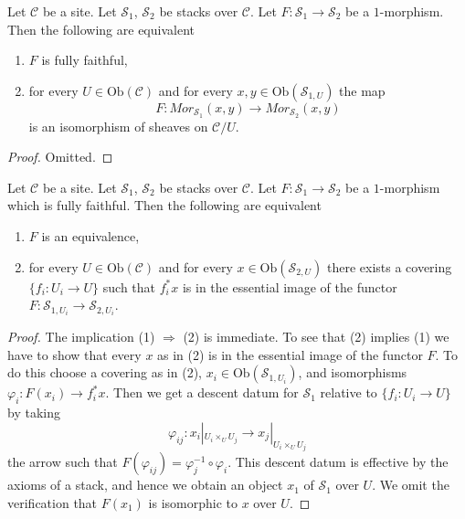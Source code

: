 \begin{lemma}
\label{lemma-characterize-ff}
Let $\mathcal{C}$ be a site.
Let $\mathcal{S}_1$, $\mathcal{S}_2$ be stacks over $\mathcal{C}$.
Let $F : \mathcal{S}_1 \to \mathcal{S}_2$ be a $1$-morphism.
Then the following are equivalent
\begin{enumerate}
\item $F$ is fully faithful,
\item for every $U \in \text{Ob}(\mathcal{C})$ and for every
$x, y \in \text{Ob}(\mathcal{S}_{1, U})$ the map
$$
F :
\mathit{Mor}_{\mathcal{S}_1}(x, y)
\longrightarrow
\mathit{Mor}_{\mathcal{S}_2}(x, y)
$$
is an isomorphism of sheaves on $\mathcal{C}/U$.
\end{enumerate}
\end{lemma}

\begin{proof}
Omitted.
\end{proof}

\begin{lemma}
\label{lemma-characterize-essentially-surjective-when-ff}
Let $\mathcal{C}$ be a site.
Let $\mathcal{S}_1$, $\mathcal{S}_2$ be stacks over $\mathcal{C}$.
Let $F : \mathcal{S}_1 \to \mathcal{S}_2$ be a $1$-morphism which is
fully faithful. Then the following are equivalent
\begin{enumerate}
\item $F$ is an equivalence,
\item for every $U \in \text{Ob}(\mathcal{C})$ and for every
$x \in \text{Ob}(\mathcal{S}_{2, U})$ there exists a covering
$\{f_i : U_i \to U\}$ such that $f_i^*x$ is in the essential image
of the functor $F : \mathcal{S}_{1, U_i} \to \mathcal{S}_{2, U_i}$.
\end{enumerate}
\end{lemma}

\begin{proof}
The implication (1) $\Rightarrow$ (2) is immediate.
To see that (2) implies (1) we have to show that every
$x$ as in (2) is in the essential image of the functor $F$.
To do this choose a covering as in (2),
$x_i \in \text{Ob}(\mathcal{S}_{1, U_i})$, and
isomorphisms $\varphi_i : F(x_i) \to f_i^*x$. Then we get a descent
datum for $\mathcal{S}_1$ relative to $\{f_i : U_i \to U\}$
by taking
$$
\varphi_{ij} :
x_i|_{U_i \times_U U_j}
\longrightarrow
x_j|_{U_i \times_U U_j}
$$
the arrow such that $F(\varphi_{ij}) = \varphi_j^{-1} \circ \varphi_i$.
This descent datum is effective by the axioms of a stack, and hence
we obtain an object $x_1$ of $\mathcal{S}_1$ over $U$. We omit the
verification that $F(x_1)$ is isomorphic to $x$ over $U$.
\end{proof}

